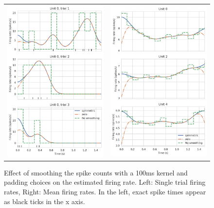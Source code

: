 \begin{figure}
    \centering
    \begin{tabular}{cc}
    \includegraphics[width=7cm]{figures/one_with_step.png}
    & \includegraphics[width=7cm]{figures/mean_with_step.png}
    \end{tabular}
    \caption[Effect of smoothing and padding choices on the estimated firing rate.]{Effect of smoothing the spike counts with a 100ms kernel and padding choices on the estimated firing rate. Left: Single trial firing rates, Right: Mean firing rates. In the left, exact spike times appear as black ticks in the x axis.}
    \label{fig:padding}
\end{figure} 

